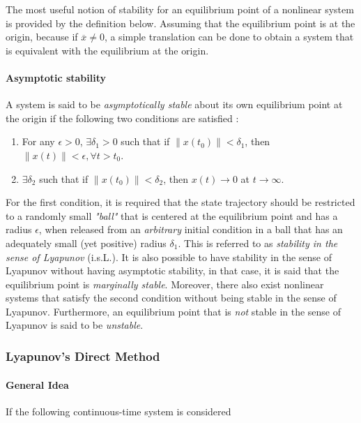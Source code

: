 \documentclass{thesisreport}
\begin{document}
The most useful notion of stability for an equilibrium point of a nonlinear system is provided by the definition below. Assuming that the equilibrium point is at the origin, because if $\overline{x} \neq 0$, a simple translation can be done to obtain a system that is equivalent with the equilibrium at the origin.

\paragraph{Asymptotic stability} A system is said to be \textit{asymptotically stable} about its own equilibrium point at the origin if the following two conditions are satisfied \cite{Dahleh2011}:

\begin{enumerate}
	\item For any $\epsilon > 0$, $\exists \delta_1 > 0$ such that if $\| x(t_0)\|<\delta_1$, then $\|x(t)\|<\epsilon, \forall t>t_0$.
	\item $\exists \delta_2$ such that if $\|x(t_0)\|<\delta_2$, then $x(t)\rightarrow 0$ at $t \rightarrow \infty$.
\end{enumerate}

For the first condition, it is required that the state trajectory should be restricted to a randomly small \textit{"ball"} that is centered at the equilibrium point and has a radius $\epsilon$, when released from an \textit{arbitrary} initial condition in a ball that has an adequately small (yet positive) radius $\delta_1$. This is referred to as \textit{stability in the sense of Lyapunov} (i.s.L.). It is also possible to have stability in the sense of Lyapunov without having asymptotic stability, in that case, it is said that the equilibrium point is \textit{marginally stable}. Moreover, there also exist nonlinear systems that satisfy the second condition without being stable in the sense of Lyapunov. Furthermore, an equilibrium point that is \textit{not} stable in the sense of Lyapunov is said to be \textit{unstable}.

\subsubsection{Lyapunov's Direct Method}

\paragraph{General Idea}

If the following continuous-time system is considered
\end{document}
